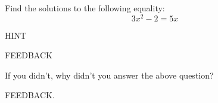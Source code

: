 \documentclass{ximera}
\begin{document}
\begin{problem} 
\begin{problem}

    Find the solutions to the following equality:
    $$3x^2 -2 = 5x$$
    
    \begin{hint}
    HINT
    \end{hint}
    
  \begin{multipleChoice}
      
          \begin{feedback}[attempt]
          FEEDBACK
          \end{feedback}
     
    \end{multipleChoice}
    
\end{problem}
\begin{question}

    If you didn't, why didn't you answer the above question?

    \begin{multipleChoice}
          \begin{feedback}[attempt]
          FEEDBACK.
          \end{feedback}
  \end{multipleChoice}
\end{question}
\end{problem}
\end{document}
